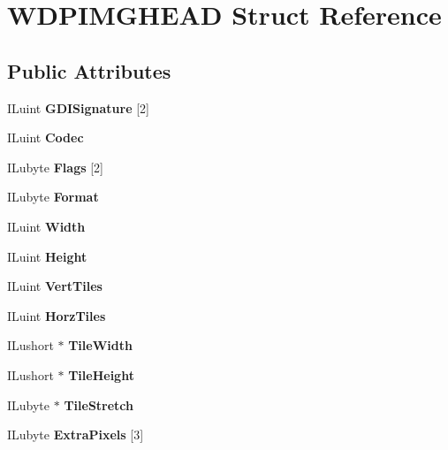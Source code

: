 \hypertarget{structWDPIMGHEAD}{}\section{W\+D\+P\+I\+M\+G\+H\+E\+AD Struct Reference}
\label{structWDPIMGHEAD}
\subsection*{Public Attributes}
\begin{DoxyCompactItemize}
\item 
\mbox{\label{structWDPIMGHEAD_a5df24d28408f85230201e1d32d2d882a}} 
I\+Luint {\bfseries G\+D\+I\+Signature} \mbox{[}2\mbox{]}
\item 
\mbox{\label{structWDPIMGHEAD_a97dabfc0751c26b58cfa01864f40d097}} 
I\+Luint {\bfseries Codec}
\item 
\mbox{\label{structWDPIMGHEAD_a9fb1c530e2ee78594a92773d1aa12397}} 
I\+Lubyte {\bfseries Flags} \mbox{[}2\mbox{]}
\item 
\mbox{\label{structWDPIMGHEAD_a522d8d4f17f359fc37c355e9380a8943}} 
I\+Lubyte {\bfseries Format}
\item 
\mbox{\label{structWDPIMGHEAD_a5868e2caeb0cc61dcade9ee2ad1749a3}} 
I\+Luint {\bfseries Width}
\item 
\mbox{\label{structWDPIMGHEAD_a8e398a78852b2cc6a1fba5c38fe1e771}} 
I\+Luint {\bfseries Height}
\item 
\mbox{\label{structWDPIMGHEAD_a6edfab3156c66c12db3a37317c08ad0a}} 
I\+Luint {\bfseries Vert\+Tiles}
\item 
\mbox{\label{structWDPIMGHEAD_aa22301430bc3c89bf20c0ecb0ea210e9}} 
I\+Luint {\bfseries Horz\+Tiles}
\item 
\mbox{\label{structWDPIMGHEAD_a5bf3a286ab54e55f115072c1ee0da14b}} 
I\+Lushort $\ast$ {\bfseries Tile\+Width}
\item 
\mbox{\label{structWDPIMGHEAD_aa10e02133c4045a7a67643234822ffc2}} 
I\+Lushort $\ast$ {\bfseries Tile\+Height}
\item 
\mbox{\label{structWDPIMGHEAD_a1ec8f7b6035a1758b4365e93cf117e86}} 
I\+Lubyte $\ast$ {\bfseries Tile\+Stretch}
\item 
\mbox{\label{structWDPIMGHEAD_a19a80cf82e37f06a21232b37de806094}} 
I\+Lubyte {\bfseries Extra\+Pixels} \mbox{[}3\mbox{]}
\end{DoxyCompactItemize}


